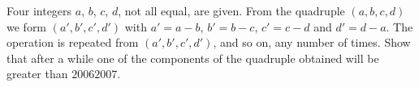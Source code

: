 Four integers $a$, $b$, $c$, $d$, not all equal, are given. From the quadruple $(a, b, c, d)$ we form $(a', b', c', d')$ with $a' = a - b$, $b' = b - c$, $c' = c - d$ and $d' = d - a$. The operation is repeated from $(a', b', c', d')$, and so on, any number of times. Show that after a while one of the components of the quadruple obtained will be greater than $20062007$.
